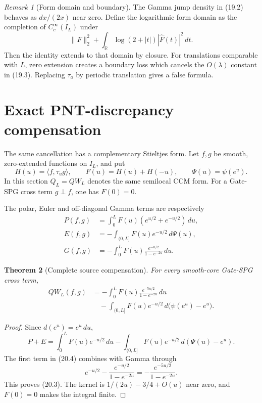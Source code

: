 \documentclass[11pt]{amsart}
\newtheorem{theorem}{Theorem}[section]
\theoremstyle{definition}
\theoremstyle{remark}
\newtheorem{remark}[theorem]{Remark}
\begin{document}
\begin{remark}[Form domain and boundary]
The Gamma jump density in (19.2) behaves as \(dx/(2x)\) near zero.  Define
the logarithmic form domain as the completion of \(C_c^\infty(I_L)\) under
\[
 \|F\|_2^2+
 \int_{\mathbb R}\log(2+|t|)|\widehat F(t)|^2\,dt.
\]
Then the identity extends to that domain by closure.
For translations comparable with \(L\), zero extension creates a boundary
loss which cancels the \(O(\lambda)\) constant in (19.3).  Replacing
\(\tau_a\) by periodic translation gives a false formula.
\end{remark}

\section{Exact PNT-discrepancy compensation}
\label{sec:pnt-compensation}

The same cancellation has a complementary Stieltjes form.  Let \(f,g\) be
smooth, zero-extended functions on \(I_L\), and put
\[
 H(u)=\langle f,\tau_ug\rangle,
 \qquad F(u)=H(u)+H(-u),
 \qquad \Psi(u)=\psi(e^u).
\tag{20.1}
\]
In this section \(Q_L=QW_L\) denotes the same semilocal CCM form.
For a Gate-SPG cross term \(g\perp f\), one has \(F(0)=0\).

The polar, Euler and off-diagonal Gamma terms are respectively
\[
\begin{aligned}
 P(f,g)
 &=\int_0^L F(u)(e^{u/2}+e^{-u/2})\,du,\\
 E(f,g)
 &=-\int_{(0,L]}F(u)e^{-u/2}\,d\Psi(u),\\
 G(f,g)
 &=-\int_0^L F(u)
 \frac{e^{-u/2}}{1-e^{-2u}}\,du.
\end{aligned}
\tag{20.2}
\]

\begin{theorem}[Complete source compensation]
\label{thm:source-compensation}
For every smooth-core Gate-SPG cross term,
\[
\boxed{
\begin{aligned}
 QW_L(f,g)
 &=
 -\int_0^L
 F(u)\frac{e^{-5u/2}}{1-e^{-2u}}\,du\\
 &\quad
 -\int_{(0,L]}F(u)e^{-u/2}\,
 d\bigl(\psi(e^u)-e^u\bigr).
\end{aligned}}
\tag{20.3}
\]
\end{theorem}

\begin{proof}
Since \(d(e^u)=e^u\,du\),
\[
 P+E
 =
 \int_0^L F(u)e^{-u/2}\,du
 -\int_{(0,L]}F(u)e^{-u/2}\,d(\Psi(u)-e^u).
\tag{20.4}
\]
The first term in (20.4) combines with Gamma through
\[
 e^{-u/2}-\frac{e^{-u/2}}{1-e^{-2u}}
 =-\frac{e^{-5u/2}}{1-e^{-2u}}.
\]
This proves (20.3).  The kernel is \(1/(2u)-3/4+O(u)\) near zero, and
\(F(0)=0\) makes the integral finite.
\end{proof}
\end{document}
